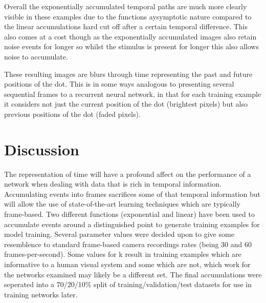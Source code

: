 Overall the exponentially accumulated temporal paths are much more clearly visible in these examples due to the functions aysymptotic nature compared to the linear accumulations hard cut off after a certain temporal difference. 
This also comes at a cost though as the exponentially accumulated images also retain noise events for longer so whilst the stimulus is present for longer this also allows noise to accumulate. 

These resulting images are blurs through time representing the past and future positions of the dot.
This is in some ways analogous to presenting several sequential frames to a recurrent neural network, in that for each training example it considers not just the current position of the dot (brightest pixels) but also previous positions of the dot (faded pixels).
 

\section{Discussion}
The representation of time will have a profound affect on the performance of a network when dealing with data that is rich in temporal information. 
Accumulating events into frames sacrifices some of that temporal information but will allow the use of state-of-the-art learning techniques which are typically frame-based. 
Two different functions (exponential and linear) have been used to accumulate events around a distinguished point to generate training examples for model training. 
Several parameter values were decided upon to give some resemblence to standard frame-based camera recordings rates (being 30 and 60 frames-per-second).
Some values for k result in training examples which are informative to a human visual system and some which are not, which work for the networks examined may likely be a different set. 
The final accumulations were seperated into a 70/20/10\% split of training/validation/test datasets for use in training networks later. 

 

